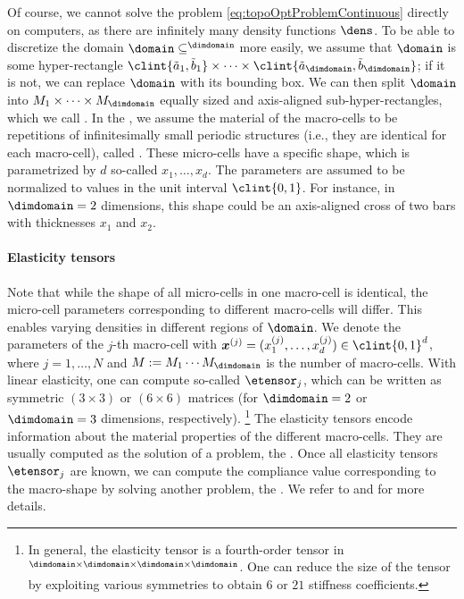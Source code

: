 Of course, we cannot solve the problem \eqref{eq:topoOptProblemContinuous}
directly on computers,
as there are infinitely many density functions $\dens$.
To be able to discretize the domain $\domain \subset \real^{\dimdomain}$
more easily, we assume that $\domain$ is some hyper-rectangle
$\clint{\tilde{a}_1, \tilde{b}_1} \times \dotsb \times
\clint{\tilde{a}_{\dimdomain}, \tilde{b}_{\dimdomain}}$;
if it is not, we can replace $\domain$ with its bounding box.
We can then split $\domain$ into $M_1 \times \dotsb \times M_{\dimdomain}$
equally sized and axis-aligned sub-hyper-rectangles,
which we call .
In the ,
we assume the material of the macro-cells to be
repetitions of infinitesimally small periodic structures
(i.e., they are identical for each macro-cell),
called .
These micro-cells have a specific shape, which is parametrized by $d$ so-called
 $x_1, \dotsc, x_d$.
The parameters are assumed to be normalized to values in the
unit interval $\clint{0, 1}$.
For instance, in $\dimdomain = 2$ dimensions,
this shape could be an axis-aligned cross of two bars
with thicknesses $x_1$ and $x_2$.

\paragraph{Elasticity tensors}

Note that while the shape of all micro-cells in one macro-cell is identical,
the micro-cell parameters corresponding to different macro-cells will differ.
This enables varying densities in different regions of $\domain$.
We denote the parameters of the $j$-th macro-cell
with $\*x^{(j)} = (x_1^{(j)}, \dotsc, x_d^{(j)}) \in \clint{0, 1}^d$,
where $j = 1, \dotsc, N$ and
$M := M_1 \dotsm M_{\dimdomain}$ is the number of macro-cells.
With linear elasticity,
one can compute so-called  $\etensor_j$,
which can be written as
symmetric $(3 \times 3)$ or $(6 \times 6)$ matrices
(for $\dimdomain = 2$ or $\dimdomain = 3$ dimensions, respectively).%
\footnote{%
  In general, the elasticity tensor is a fourth-order tensor in
  $\real^{\dimdomain \times \dimdomain \times \dimdomain \times \dimdomain}$.
  One can reduce the size of the tensor by exploiting various symmetries
  \cite{Huebner14Mehrdimensionale}
  to obtain $6$ or $21$ stiffness coefficients.%
}
The elasticity tensors encode information about the material properties
of the different macro-cells.
They are usually computed as the solution of a \fem problem,
the .
Once all elasticity tensors $\etensor_j$ are known,
we can compute the compliance value corresponding to the macro-shape
by solving another \fem problem, the .
We refer to \cite{Allaire04Topology} and \cite{Huebner14Mehrdimensionale}
for more details.

